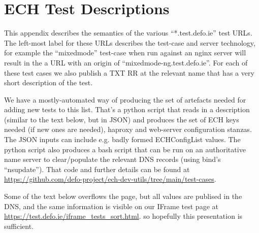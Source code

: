 \section{ECH Test Descriptions}
\label{app:testdescriptions}

This appendix describes the semantics of the various ``*.test.defo.ie'' test URLs.
The left-most label for these URLs describes the test-case and server technology,
for example the ``mixedmode'' test-case when run against an nginx server will
result in the a URL with an origin of ``mixedmode-ng.test.defo.ie''. For each of
these test cases we also publish a TXT RR at the relevant name that has a very
short description of the test.

We have a mostly-automated way of producing the set of artefacts needed for
adding new tests to this list. That's a python script that reads in a
description (similar to the text below, but in JSON) and produces the set of
ECH keys needed (if new ones are needed), haproxy and web-server configuration
stanzas. The JSON inputs can include e.g. badly formed ECHConfigList values.
The python script also produces a bash script that can be run on an
authoritative name server to clear/populate the relevant DNS records (using
bind's ``nsupdate'').  That code and further  details can be found at
\url{https://github.com/defo-project/ech-dev-utils/tree/main/test-cases}.

Some of the text below overflows the page, but all values are publised in the
DNS, and the same information is visible on our IFrame test page at
\url{https://test.defo.ie/iframe_tests_sort.html}.  so hopefully this
presentation is sufficient.

